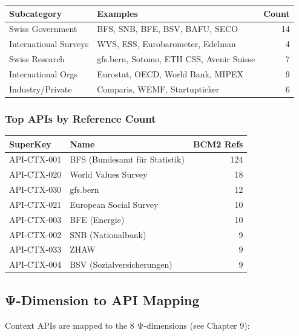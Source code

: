 \begin{center}
\begin{tabular}{llr}
\toprule
\textbf{Subcategory} & \textbf{Examples} & \textbf{Count} \\
\midrule
Swiss Government & BFS, SNB, BFE, BSV, BAFU, SECO & 14 \\
International Surveys & WVS, ESS, Eurobarometer, Edelman & 4 \\
Swiss Research & gfs.bern, Sotomo, ETH CSS, Avenir Suisse & 7 \\
International Orgs & Eurostat, OECD, World Bank, MIPEX & 9 \\
Industry/Private & Comparis, WEMF, Startupticker & 6 \\
\bottomrule
\end{tabular}
\end{center}

\subsubsection{Top APIs by Reference Count}

\begin{center}
\begin{tabular}{llr}
\toprule
\textbf{SuperKey} & \textbf{Name} & \textbf{BCM2 Refs} \\
\midrule
API-CTX-001 & BFS (Bundesamt für Statistik) & 124 \\
API-CTX-020 & World Values Survey & 18 \\
API-CTX-030 & gfs.bern & 12 \\
API-CTX-021 & European Social Survey & 10 \\
API-CTX-003 & BFE (Energie) & 10 \\
API-CTX-002 & SNB (Nationalbank) & 9 \\
API-CTX-033 & ZHAW & 9 \\
API-CTX-004 & BSV (Sozialversicherungen) & 9 \\
\bottomrule
\end{tabular}
\end{center}

\subsection{Ψ-Dimension to API Mapping}

Context APIs are mapped to the 8 Ψ-dimensions (see Chapter 9):

